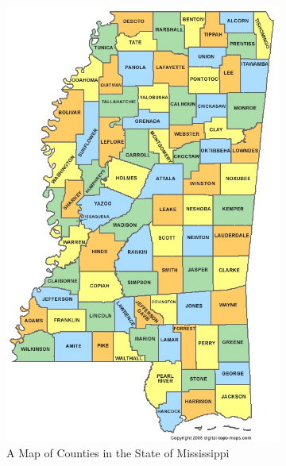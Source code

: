 \documentclass[titlepage]{article}
\begin{document}
  \begin{figure}[H]
    \center
    \begin{subfigure}[b]{0.5\textwidth}
      \center
      \includegraphics[width=.9\linewidth]{figures/county_map.jpg}
      \caption*{A Map of Counties in the State of Mississippi \cite{county_map}}
    \end{subfigure}~
    \begin{subfigure}[b]{0.5\textwidth}
      \center

\end{subfigure}
\end{figure}
\end{document}

